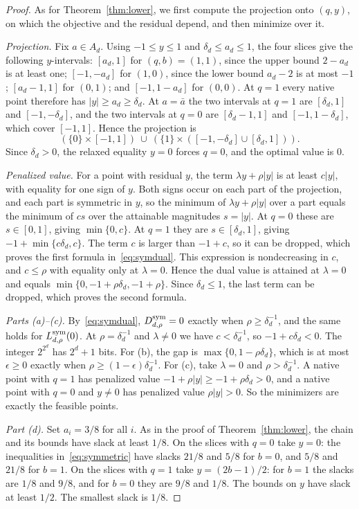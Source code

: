 \begin{proof}
As for Theorem~\ref{thm:lower}, we first compute the projection onto
$(q,y)$, on which the objective and the residual depend, and then minimize
over it.

\emph{Projection.} Fix $a\in A_d$. Using $-1\le y\le1$ and
$\delta_d\le a_d\le1$, the four slices give the following $y$-intervals:
$[a_d,1]$ for $(q,b)=(1,1)$, since the upper bound $2-a_d$ is at least
one; $[-1,-a_d]$ for $(1,0)$, since the lower bound $a_d-2$ is at most
$-1$; $[a_d-1,1]$ for $(0,1)$; and $[-1,1-a_d]$ for $(0,0)$. At $q=1$
every native point therefore has $|y|\ge a_d\ge\delta_d$. At $a=\bar a$
the two intervals at $q=1$ are $[\delta_d,1]$ and $[-1,-\delta_d]$, and
the two intervals at $q=0$ are $[\delta_d-1,1]$ and $[-1,1-\delta_d]$,
which cover $[-1,1]$. Hence the projection is
\[
 (\{0\}\times[-1,1])\ \cup\
 (\{1\}\times([-1,-\delta_d]\cup[\delta_d,1])).
\]
Since $\delta_d>0$, the relaxed equality $y=0$ forces $q=0$, and the
optimal value is $0$.

\emph{Penalized value.} For a point with residual $y$, the term
$\lambda y+\rho|y|$ is at least $c|y|$, with equality for one sign of $y$.
Both signs occur on each part of the projection, and each part is
symmetric in $y$, so the minimum of $\lambda y+\rho|y|$ over a part equals
the minimum of $cs$ over the attainable magnitudes $s=|y|$. At $q=0$ these
are $s\in[0,1]$, giving $\min\{0,c\}$. At $q=1$ they are
$s\in[\delta_d,1]$, giving $-1+\min\{c\delta_d,c\}$. The term $c$ is
larger than $-1+c$, so it can be dropped, which proves the first formula
in~\eqref{eq:symdual}. This expression is nondecreasing in $c$, and
$c\le\rho$ with equality only at $\lambda=0$. Hence the dual value is
attained at $\lambda=0$ and equals $\min\{0,-1+\rho\delta_d,-1+\rho\}$.
Since $\delta_d\le1$, the last term can be dropped, which proves the
second formula.

\emph{Parts (a)--(c).} By~\eqref{eq:symdual}, $D^{\rm sym}_{d,\rho}=0$
exactly when $\rho\ge\delta_d^{-1}$, and the same holds for
$L^{\rm sym}_{d,\rho}(0)$. At $\rho=\delta_d^{-1}$ and $\lambda\ne0$ we
have $c<\delta_d^{-1}$, so $-1+c\delta_d<0$. The integer $2^{2^d}$ has
$2^d+1$ bits. For (b), the gap is $\max\{0,1-\rho\delta_d\}$, which is at
most $\epsilon\ge0$ exactly when $\rho\ge(1-\epsilon)\delta_d^{-1}$. For
(c), take $\lambda=0$ and $\rho>\delta_d^{-1}$. A native point with $q=1$
has penalized value $-1+\rho|y|\ge-1+\rho\delta_d>0$, and a native point
with $q=0$ and $y\ne0$ has penalized value $\rho|y|>0$. So the minimizers
are exactly the feasible points.

\emph{Part (d).} Set $a_i=3/8$ for all $i$. As in the proof of
Theorem~\ref{thm:lower}, the chain and its bounds have slack at least
$1/8$. On the slices with $q=0$ take $y=0$: the inequalities
in~\eqref{eq:symmetric} have slacks $21/8$ and $5/8$ for $b=0$, and $5/8$
and $21/8$ for $b=1$. On the slices with $q=1$ take $y=(2b-1)/2$: for
$b=1$ the slacks are $1/8$ and $9/8$, and for $b=0$ they are $9/8$ and
$1/8$. The bounds on $y$ have slack at least $1/2$. The smallest slack is
$1/8$.
\end{proof}

